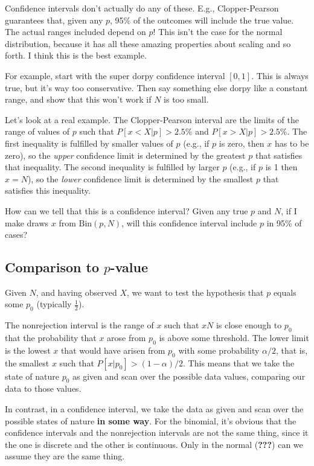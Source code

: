 \documentclass{book}
\begin{document}
Confidence intervals don't actually do any of these. E.g.,
Clopper-Pearson guarantees that, given any \(p\), 95\% of the outcomes
will include the true value. The actual ranges included depend on \(p\)!
This isn't the case for the normal distribution, because it has all
these amazing properties about scaling and so forth. I think this is the
best example.

For example, start with the super dorpy confidence interval \([0, 1]\).
This is always true, but it's way too conservative. Then say something
else dorpy like a constant range, and show that this won't work if \(N\)
is too small.

Let's look at a real example. The Clopper-Pearson interval are the
limits of the range of values of \(p\) such that
\(P[x < X | p] > 2.5\%\) and \(P[x > X | p] > 2.5\%\). The first
inequality is fulfilled by smaller values of \(p\) (e.g., if \(p\) is
zero, then \(x\) has to be zero), so the \emph{upper} confidence limit
is determined by the greatest \(p\) that satisfies that inequality. The
second inequality is fulfilled by larger \(p\) (e.g., if \(p\) is 1 then
\(x=N\)), so the \emph{lower} confidence limit is determined by the
smallest \(p\) that satisfies this inequality.

How can we tell that this is a confidence interval? Given any true \(p\)
and \(N\), if I make draws \(x\) from \(\mathrm{Bin}(p, N)\), will this
confidence interval include \(p\) in 95\% of cases?

\subsection{\texorpdfstring{Comparison to
\(p\)-value}{Comparison to p-value}}\label{comparison-to-p-value}

Given \(N\), and having observed \(X\), we want to test the hypothesis
that \(p\) equals some \(p_0\) (typically \(\tfrac{1}{2}\)).

The nonrejection interval is the range of \(x\) such that \(x N\) is
close enough to \(p_0\) that the probability that \(x\) arose from
\(p_0\) is above some threshold. The lower limit is the lowest \(x\)
that would have arisen from \(p_0\) with some probability \(\alpha/2\),
that is, the smallest \(x\) such that \(P[x | p_0] > (1-\alpha)/2\).
This means that we take the state of nature \(p_0\) as given and scan
over the possible data values, comparing our data to those values.

In contrast, in a confidence interval, we take the data as given and
scan over the possible states of nature \textbf{in some way}. For the
binomial, it's obvious that the confidence intervals and the
nonrejection intervals are not the same thing, since it the one is
discrete and the other is continuous. Only in the normal (\textbf{???})
can we assume they are the same thing.
\end{document}
